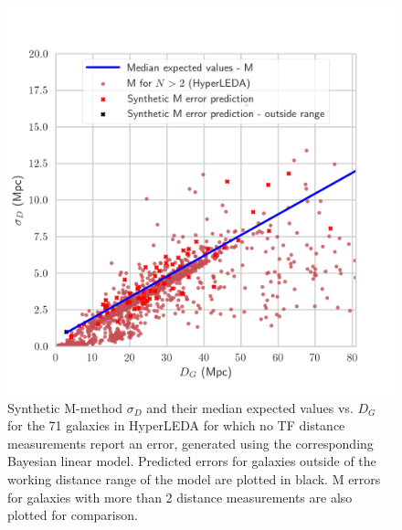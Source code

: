 \documentclass[a4paper,fleqn,usenatbib]{mnras}
\begin{document}
\begin{figure}
	\includegraphics[scale=0.7]{predhl2.png}
    \caption{Synthetic M-method $\sigma_D$ and their median expected values vs. $D_G$ for the 71 galaxies in HyperLEDA for which no TF distance measurements report an error, generated using the corresponding Bayesian linear model. Predicted errors for galaxies outside of the working distance range of the model are plotted in black. M errors for galaxies with more than 2 distance measurements are also plotted for comparison.}
    \label{fig:predhl2}
\end{figure}
\end{document}
